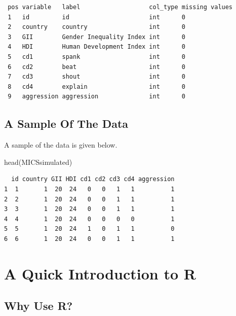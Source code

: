 \documentclass[
  letterpaper,
  DIV=11,
  numbers=noendperiod]{scrreprt}
\newenvironment{Shaded}{\begin{snugshade}}{\end{snugshade}}
\newcommand{\FunctionTok}[1]{\textcolor[rgb]{0.28,0.35,0.67}{#1}}
\newcommand{\NormalTok}[1]{\textcolor[rgb]{0.00,0.23,0.31}{#1}}
\begin{document}
\begin{verbatim}
 pos variable   label                   col_type missing values
 1   id         id                      int      0             
 2   country    country                 int      0             
 3   GII        Gender Inequality Index int      0             
 4   HDI        Human Development Index int      0             
 5   cd1        spank                   int      0             
 6   cd2        beat                    int      0             
 7   cd3        shout                   int      0             
 8   cd4        explain                 int      0             
 9   aggression aggression              int      0             
\end{verbatim}

\hypertarget{a-sample-of-the-data}{%
\section{A Sample Of The Data}\label{a-sample-of-the-data}}

A sample of the data is given below.

\begin{Shaded}
\begin{Highlighting}[]
\FunctionTok{head}\NormalTok{(MICSsimulated)}
\end{Highlighting}
\end{Shaded}

\begin{verbatim}
  id country GII HDI cd1 cd2 cd3 cd4 aggression
1  1       1  20  24   0   0   1   1          1
2  2       1  20  24   0   0   1   1          1
3  3       1  20  24   0   0   1   1          1
4  4       1  20  24   0   0   0   0          1
5  5       1  20  24   1   0   1   1          0
6  6       1  20  24   0   0   1   1          1
\end{verbatim}


\hypertarget{a-quick-introduction-to-r}{%
\chapter{A Quick Introduction to R}\label{a-quick-introduction-to-r}}

\hypertarget{why-use-r}{%
\section{Why Use R?}\label{why-use-r}}
\end{document}
